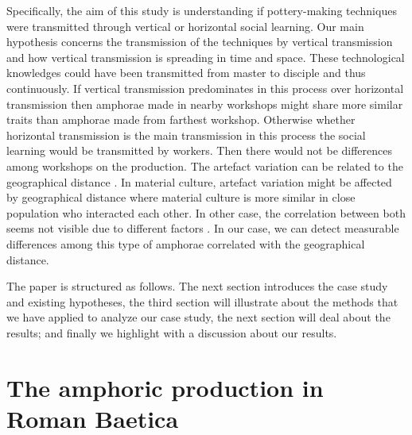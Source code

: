 \documentclass[review]{elsarticle}
\begin{document}
Specifically, the aim of this study is understanding if pottery-making techniques were transmitted through vertical or horizontal social learning. Our main hypothesis concerns the transmission of the techniques by vertical transmission and how vertical transmission is spreading in time and space. These technological knowledges could have been transmitted from master to disciple and thus continuously. If vertical transmission predominates in this process over horizontal transmission then amphorae made in nearby workshops might share more similar traits than amphorae made from farthest workshop. Otherwise whether horizontal transmission is the main transmission in this process the social learning would be transmitted by workers. Then there would not be differences among workshops on the production. The artefact variation can be related to the geographical distance \citep{bjorklund_effect_2010,shennan_isolation-by-distance_2015, van_strien_isolation-by-distance_2015}. In material culture, artefact variation might be affected by geographical distance where material culture is more similar in close population who interacted each other. In other case, the correlation between both seems not visible due to different factors \citep{hart_effects_2012}. In our case, we can detect measurable differences among this type of amphorae correlated with the geographical distance.

The paper is structured as follows. The next section introduces the case study and existing hypotheses, the third section will illustrate about the methods that we have applied to analyze our case study, the next section will deal about the results; and finally we highlight with a discussion about our results.  


\section{The amphoric production in Roman Baetica}
\end{document}
